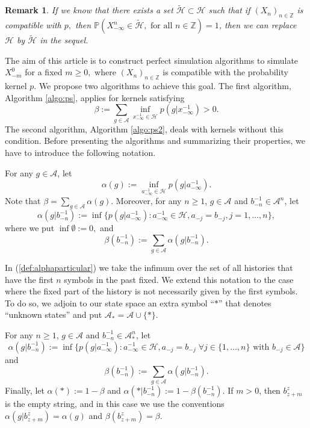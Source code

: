 \documentclass[a4paper]{article}
\newtheorem{remark}{Remark}%
\def\P{{\mathbb P}}
\newcommand{\Z}{\mathbb{Z}}
\newcommand{\N}{\mathbb{N}}
\renewcommand{\H}{\mathcal{H}}
\newcommand{\A}{\mathcal{A}}
\newcommand{\mydef}{:=}
\begin{document}
\begin{remark}
If we know that there exists a set $\tilde{\H}\subset \H$ such that if $(X_n)_{n\in \Z}$ is compatible with $p,$ then $\P(X_{-\infty}^{n} \in \tilde{\H}, \text{ for all } n\in \Z)=1$, then we can replace $\H$ by $\tilde{\H}$ in the sequel.
\end{remark}

The aim of this article is to construct perfect simulation algorithms to simulate $X_{-m}^{0}$ for a fixed $m\geq 0,$ where $(X_n)_{n \in \Z}$ is compatible with the probability kernel $p.$ We propose two algorithms to achieve this goal. The first algorithm, Algorithm \ref{algo:ps}, applies for kernels satisfying 
\begin{equation}\label{def:alpha}
\beta:=\sum_{g\in \A}\inf_{x^{-1}_{-\infty}\in \H}p(g|x^{-1}_{-\infty})>0.
\end{equation}
The second algorithm, Algorithm \ref{algo:ps2}, deals with kernels without this condition.
Before presenting the algorithms and summarizing their properties, we have to introduce the following notation.

For any $g\in \A$, let
$$
\alpha(g):=\inf_{a_{-\infty}^{-1} \in \H}p(g|a_{-\infty}^{-1}).
$$
Note that $\beta=\sum_{g\in \A}\alpha(g)$.
Moreover, for any $n\geq 1$, $g\in \A$ and $b_{-n}^{-1}\in \A^{n}$, let
\begin{equation}\label{def:alphaparticular}
\alpha(g|b_{-n}^{-1})\mydef\inf\{p(g|a_{-\infty}^{-1}): a_{-\infty}^{-1} \in \H, a_{-j}=b_{-j}, j=1,\ldots,n\} ,
\end{equation}
where we put $ \inf \emptyset := 0,$ 
and 
\begin{equation}\label{eq:beta}
\beta( b_{-n}^{-1})\mydef\sum_{g\in \A}\alpha(g|b_{-n}^{-1}).
\end{equation}


In (\ref{def:alphaparticular}) we take the infimum over the set of all histories that have the first $n$ symbols in the past fixed. We extend this notation to the case where the fixed part of the history is not necessarily given by the first symbols. To do so, we adjoin to our state space an extra symbol ``$*$'' that denotes ``unknown states'' and put $\A_*=\A\cup\{*\}$. 

For any $n\geq 1$, $g\in \A$ and $b_{-n}^{-1}\in \A_*^{n}$, let
\begin{equation}\label{def:alphageneral}
\alpha(g|b_{-n}^{-1})\mydef\inf\{p(g|a_{-\infty}^{-1}): a_{-\infty}^{-1} \in \H, a_{-j}=b_{-j}\;   \forall  j \in \{1, \ldots,n\} \mbox{ with }  b_{-j} \in \A\}
\end{equation}
and 
\begin{equation}\label{def:beta}
\beta(b_{-n}^{-1})\mydef\sum_{g\in \A}\alpha(g|b_{-n}^{-1}).
\end{equation}
Finally, let $\alpha(*)\mydef 1-\beta$ and $\alpha(*|b_{-n}^{-1}) \mydef 1-\beta( b_{-n}^{-1})$. If $ m > 0$, then $b_{z+m}^{z}$ is the empty string, and in this case we use the conventions $\alpha(g|b_{z+m}^{z})=\alpha(g)$ and $\beta(b_{z+m}^{z})=\beta$.
\end{document}
